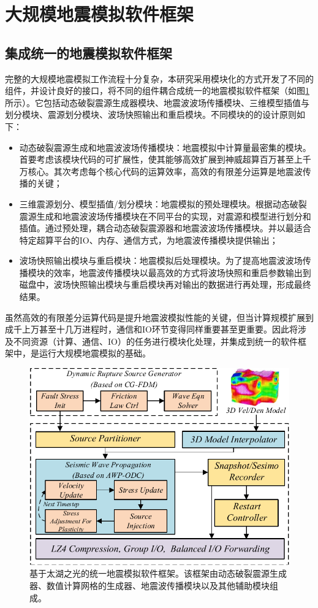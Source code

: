 \documentclass[degree=doctor]{thuthesis}
\begin{document}
\section{大规模地震模拟软件框架} %
\label{sec:大规模地震模拟软件框架}

\subsection{集成统一的地震模拟软件框架}
完整的大规模地震模拟工作流程十分复杂，本研究采用模块化的方式开发了不同的组件，并设计良好的接口，将不同的组件耦合成统一的地震模拟软件框架（如图\ref{fig:framework}所示）。它包括动态破裂震源生成器模块、地震波波场传播模块、三维模型插值与划分模块、震源划分模块、波场快照输出和重启模块。不同模块的的设计原则如下：
\begin{itemize}
  \item 动态破裂震源生成和地震波波场传播模块：地震模拟中计算量最密集的模块。首要考虑该模块代码的可扩展性，使其能够高效扩展到神威超算百万甚至上千万核心。其次考虑每个核心代码的运算效率，高效的有限差分运算是地震波传播的关键；
  \item 三维震源划分、模型插值/划分模块：地震模拟的预处理模块。根据动态破裂震源生成和地震波波场传播模块在不同平台的实现，对震源和模型进行划分和插值。通过预处理，耦合动态破裂震源器和地震波波场传播模块。并以最适合特定超算平台的IO、内存、通信方式，为地震波传播模块提供输出；
  \item 波场快照输出模块与重启模块：地震模拟后处理模块。为了提高地震波波场传播模块的效率，地震波传播模块以最高效的方式将波场快照和重启参数输出到磁盘中，波场快照输出模块与重启模块再对输出的数据进行再处理，形成最终结果。
\end{itemize}

虽然高效的有限差分运算代码是提升地震波模拟性能的关键，但当计算规模扩展到成千上万甚至十几万进程时，通信和IO环节变得同样重要甚至更重要。因此将涉及不同资源（计算、通信、IO）的任务进行模块化处理，并集成到统一的软件框架中，是运行大规模地震模拟的基础。

\begin{figure}[ht]
\centering
\includegraphics[width=0.9\columnwidth]{architecture.pdf}
\caption{基于太湖之光的统一地震模拟软件框架。该框架由动态破裂震源生成器、数值计算网格的生成器、地震波传播模块以及其他辅助模块组成。}
\label{fig:framework}
\end{figure}
\end{document}
